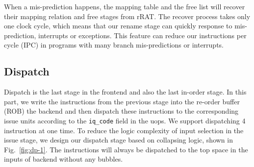 When a mis-prediction happens, the mapping table and the free list will recover their mapping relation and free stages from rRAT. The recover process takes only one clock cycle, which means that our rename stage can quickly response to mis-prediction, interrupts or exceptions. This feature can reduce our instructions per cycle (IPC) in programs with many branch mis-predictions or interrupts.

\subsection{Dispatch} %

Dispatch is the last stage in the frontend and also the last in-order stage. In this part, we write the instructions from the previous stage into the re-order buffer (ROB) the backend and then dispatch these instructions to the corresponding issue units according to the \texttt{iq\_code} field in the uops. We support dispatching 4 instruction at one time. To reduce the logic complexity of input selection in the issue stage, we design our dispatch stage based on collapsing logic, shown in Fig.~\ref{fig:dp-1}. The instructions will always be dispatched to the top space in the inputs of backend without any bubbles.

